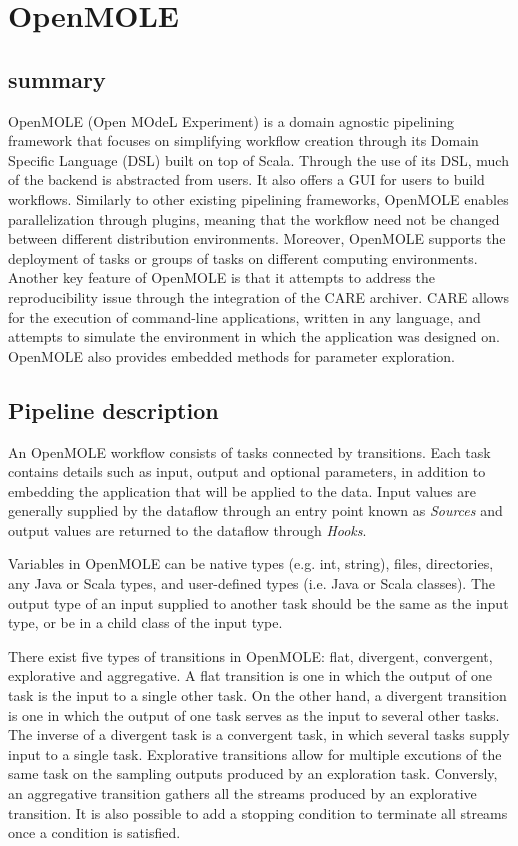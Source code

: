 \documentclass{report}
\begin{document}
         \section{OpenMOLE}
        \subsection{summary}
        OpenMOLE (Open MOdeL Experiment) is a domain agnostic pipelining
framework that focuses on simplifying workflow creation through its Domain
Specific Language (DSL) built on top of Scala. Through the use of its DSL, much
of the backend is abstracted from users. It also offers a GUI for users to build
workflows. Similarly to other existing pipelining
frameworks, OpenMOLE enables parallelization through plugins, meaning that the
workflow need not be changed between different distribution environments.
Moreover, OpenMOLE supports the deployment of tasks or groups of tasks on different
computing environments.
Another key feature of OpenMOLE is that it attempts to address the
reproducibility issue through the integration of the CARE archiver. CARE allows
for the execution of command-line applications, written in any language, and
attempts to simulate the environment in which the application was designed on.
OpenMOLE also provides embedded methods for parameter exploration.

        \subsection{Pipeline description}
       An OpenMOLE workflow consists of tasks connected by transitions. Each
task contains details such as input, output and optional parameters, in addition
to embedding the application that will be applied to the data. Input values are
generally supplied by the dataflow through an entry point known as
\textit{Sources} and output values are returned to the
dataflow through \textit{Hooks}.   

      Variables in OpenMOLE can be native types (e.g. int, string), files,
directories, any Java or Scala types, and user-defined types (i.e. Java or Scala
classes). The output type of an input supplied to another task should be the
same as the input type, or be in a child class of the input type.

      There exist five types of transitions in OpenMOLE: flat, divergent,
convergent, explorative and aggregative. A flat transition is one in which the output of one
task is the input to a single other task. On the other hand, a divergent
transition is one in which the output of one task serves as the input to several
other tasks. The inverse of a divergent task is a convergent task, in which
several tasks supply input to a single task. Explorative transitions allow for
multiple excutions of the same task on the sampling outputs produced by an
exploration task. Conversly, an aggregative transition gathers all the streams
produced by an explorative transition. It is also possible to add a stopping
condition to terminate all streams once a condition is satisfied.
\end{document}
